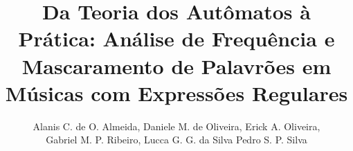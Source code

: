 \documentclass[12pt]{article}
\title{Da Teoria dos Autômatos à Prática: Análise de Frequência e Mascaramento de Palavrões em Músicas com Expressões Regulares}
\author{
    Alanis C. de O. Almeida\inst{*},
    Daniele M. de Oliveira\inst{**},
    Erick A. Oliveira\inst{***},\\
    Gabriel M. P. Ribeiro\inst{****},
    Lucca G. G. da Silva\inst{*****}
    Pedro S. P. Silva
    \inst{******}
}
\begin{document}
    \maketitle

    
    
    
    
    
    

    

    \nocite{*}

    
    
\end{document}
